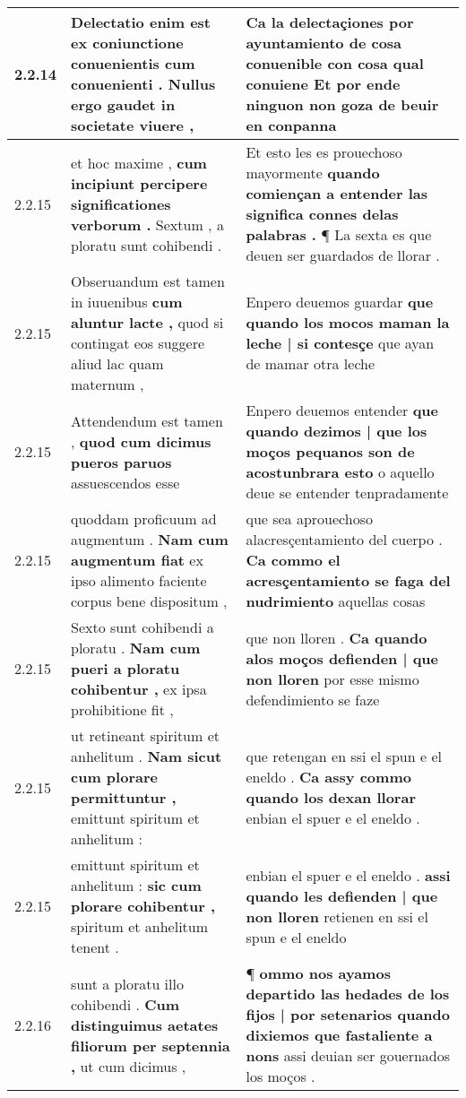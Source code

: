 \begin{tabular}{|p{1cm}|p{6.5cm}|p{6.5cm}|}
2.2.14 & Delectatio enim est \textbf{ ex coniunctione conuenientis cum conuenienti . } Nullus ergo gaudet in societate viuere , & Ca la delectaçiones \textbf{ por ayuntamiento de cosa conuenible con cosa qual conuiene } Et por ende ninguon non goza de beuir en conpanna \\\hline
2.2.15 & et hoc maxime , \textbf{ cum incipiunt percipere significationes verborum . } Sextum , a ploratu sunt cohibendi . & Et esto les es prouechoso mayormente \textbf{ quando comiençan a entender las significa connes delas palabras . } ¶ La sexta es que deuen ser guardados de llorar . \\\hline
2.2.15 & Obseruandum est tamen in iuuenibus \textbf{ cum aluntur lacte , } quod si contingat eos suggere aliud lac quam maternum , & Enpero deuemos guardar \textbf{ que quando los mocos maman la leche | si contesçe } que ayan de mamar otra leche \\\hline
2.2.15 & Attendendum est tamen , \textbf{ quod cum dicimus pueros paruos } assuescendos esse & Enpero deuemos entender \textbf{ que quando dezimos | que los moços pequanos son de acostunbrara esto } o aquello deue se entender tenpradamente \\\hline
2.2.15 & quoddam proficuum ad augmentum . \textbf{ Nam cum augmentum fiat } ex ipso alimento faciente corpus bene dispositum , & que sea aprouechoso alacresçentamiento del cuerpo . \textbf{ Ca commo el acresçentamiento se faga del nudrimiento } aquellas cosas \\\hline
2.2.15 & Sexto sunt cohibendi a ploratu . \textbf{ Nam cum pueri a ploratu cohibentur , } ex ipsa prohibitione fit , & que non lloren . \textbf{ Ca quando alos moços defienden | que non lloren } por esse mismo defendimiento se faze \\\hline
2.2.15 & ut retineant spiritum et anhelitum . \textbf{ Nam sicut cum plorare permittuntur , } emittunt spiritum et anhelitum : & que retengan en ssi el spun e el eneldo . \textbf{ Ca assy commo quando los dexan llorar } enbian el spuer e el eneldo . \\\hline
2.2.15 & emittunt spiritum et anhelitum : \textbf{ sic cum plorare cohibentur , } spiritum et anhelitum tenent . & enbian el spuer e el eneldo . \textbf{ assi quando les defienden | que non lloren } retienen en ssi el spun e el eneldo \\\hline
2.2.16 & sunt a ploratu illo cohibendi . \textbf{ Cum distinguimus aetates filiorum per septennia , } ut cum dicimus , & ¶ \textbf{ ommo nos ayamos departido las hedades de los fijos | por setenarios quando dixiemos que fastaliente a nons } assi deuian ser gouernados los moços . \\\hline

\end{tabular}
